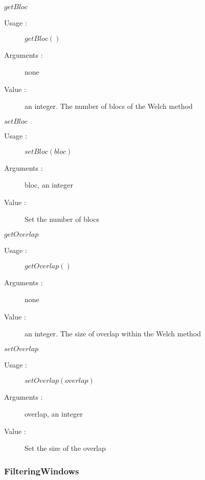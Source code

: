 \begin{description}
\begin{description}
    \item $getBloc$
    \begin{description}
    \item[Usage :] $getBloc()$
    \item[Arguments :] none
    \item[Value :]  an integer. The number of blocs of the Welch method
    \end{description}
    \bigskip

    \item $setBloc$
    \begin{description}
    \item[Usage :] $setBloc(bloc)$
    \item[Arguments :] bloc, an integer
    \item[Value :]  Set the number of blocs
    \end{description}
    \bigskip

    \item $getOverlap$
    \begin{description}
    \item[Usage :] $getOverlap()$
    \item[Arguments :] none
    \item[Value :]  an integer. The size of overlap within the Welch method
    \end{description}
    \bigskip

    \item $setOverlap$
    \begin{description}
    \item[Usage :] $setOverlap(overlap)$
    \item[Arguments :] overlap, an integer
    \item[Value :]  Set the size of the overlap
    \end{description}
    \bigskip

  \end{description}


\end{description}


\newpage \subsubsection{FilteringWindows}


